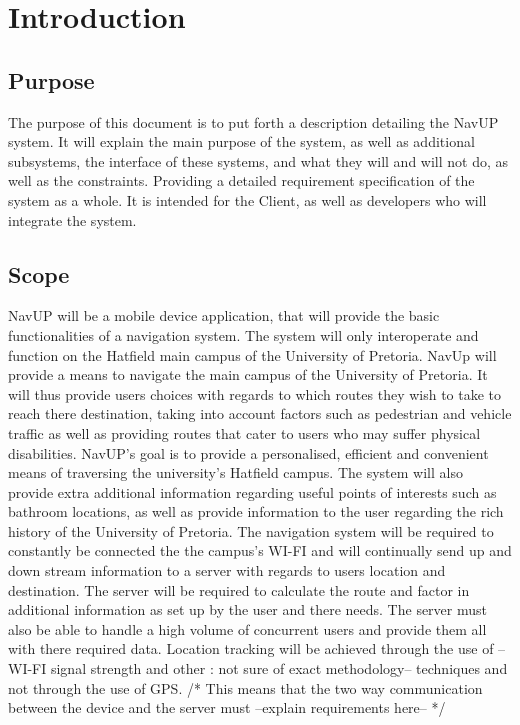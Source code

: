 \documentclass{article}
\begin{document}
	\newpage
	
	\section{Introduction}
    	
        \subsection{Purpose}
        	{The purpose of this document is to put forth a description detailing the NavUP system. It will explain the main purpose of the system, as well as additional subsystems, the interface of these systems, and what they will and will not do, as well as the constraints. Providing a detailed requirement specification of the system as a whole. It is intended for the Client, as well as developers who will integrate the system.}
    	\subsection{Scope}
{NavUP will be a mobile device application, that will provide the basic functionalities of a navigation system. The system will only interoperate and function on the Hatfield main campus of the University of Pretoria.  	NavUp will provide a means to navigate the main campus of the University of Pretoria. It will thus provide users choices with regards to which routes they wish to take to reach there destination, taking into account factors such as pedestrian and vehicle traffic as well as providing routes that cater to users who may suffer physical disabilities.  NavUP's goal is to provide a personalised, efficient and convenient means of traversing the university's Hatfield campus. The system will also provide extra additional information regarding useful points of interests such as bathroom locations, as well as provide information to the user regarding the rich history of the University of Pretoria. The navigation system will be required to constantly be connected the the campus's WI-FI and will continually send up and down stream information to a server with regards to users location and destination. The server will be required to calculate the route and factor in additional information as set up by the user and there needs. The server must also be able to handle a high volume of concurrent users and provide them all with there required data. Location tracking will be achieved through the use of --WI-FI signal strength and other : not sure of exact methodology-- techniques and not through the use of GPS. /* This means that the two way communication between the device and the server must --explain requirements here-- */ }
\end{document}
